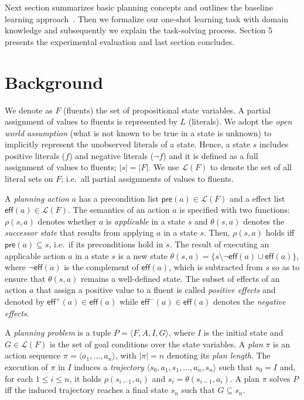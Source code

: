 \documentclass{article}
\newcommand{\tup}[1]{{\langle #1 \rangle}}
\newcommand{\pre}{\mathsf{pre}}     %
\newcommand{\eff}{\mathsf{eff}}     %
\begin{document}
Next section summarizes basic planning concepts and outlines the baseline learning approach~\cite{aineto2018learning}. Then we formalize our one-shot learning task with domain knowledge and subsequently we explain the task-solving process. Section 5 presents the experimental evaluation and last section concludes.



\section{Background}
\label{sec:background}

We denote as $F$ (fluents) the set of  propositional state variables. A partial assignment of values to fluents is represented by $L$ (literals). We adopt the \emph{open world assumption} (what is not known to be true in a state is unknown) to implicitly represent the unobserved literals of a state. Hence, a state $s$ includes positive literals ($f$) and negative literals ($\neg f$) and it is defined as a full assignment of values to fluents; $|s|=|F|$. We use $\mathcal{L}(F)$ to denote the set of all literal sets on $F$; i.e.~all partial assignments of values to fluents.

A {\em planning action} $a$ has a precondition list $\pre(a)\in\mathcal{L}(F)$ and a effect list $\eff(a)\in\mathcal{L}(F)$. The semantics of an action $a$ is specified with two functions: $\rho(s,a)$ denotes whether $a$ is {\em applicable} in a state $s$ and $\theta(s,a)$ denotes the {\em successor state} that results from applying $a$ in a state $s$. Then, $\rho(s,a)$ holds iff $\pre(a)\subseteq s$, i.e.~if its preconditions hold in $s$. The result of executing an applicable action $a$ in a state $s$ is a new state $\theta(s,a)=\{s\setminus \neg\eff(a)\cup\eff(a)\}$, where $\neg\eff(a)$ is the complement of $\eff(a)$, which is subtracted from $s$ so as to ensure that $\theta(s,a)$ remains a well-defined state. The subset of effects of an action $a$ that assign a positive value to a fluent is called {\em positive effects} and denoted by $\eff^+(a)\in \eff(a)$ while $\eff^-(a)\in \eff(a)$ denotes the {\em negative effects}.


A {\em planning problem} is a tuple $P=\tup{F,A,I,G}$, where $I$ is the initial state and $G\in\mathcal{L}(F)$ is the set of goal conditions over the state variables. A {\em plan} $\pi$ is an action sequence $\pi=\tup{a_1, \ldots, a_n}$, with $|\pi|=n$ denoting its {\em plan length}. The execution of $\pi$ in $I$ induces a {\em trajectory} $\tup{s_0, a_1, s_1, \ldots, a_n, s_n}$ such that $s_0=I$ and, for each {\small $1\leq i\leq n$}, it holds $\rho(s_{i-1},a_i)$ and $s_i=\theta(s_{i-1},a_i)$. A plan $\pi$ solves $P$ iff the induced trajectory reaches a final state $s_n$ such that $G \subseteq s_n$.
\end{document}
